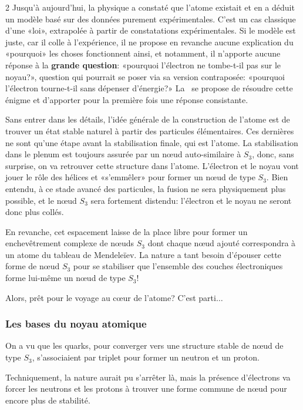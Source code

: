\begin{multicols}{2}
Jusqu'à aujourd'hui, la physique a constaté que l'atome existait et en
a déduit un modèle basé sur des données purement expérimentales. C'est
un cas classique d'une «loi», extrapolée à partir de constatations
expérimentales\cite{poincare:1902:sh}. Si le modèle est juste, car il colle à l'expérience,
il ne propose en revanche aucune explication du «pourquoi» les choses
fonctionnent ainsi, et notamment, il n'apporte aucune réponse à la
\textbf{grande question}: «pourquoi l'électron ne tombe-t-il pas sur le
noyau?», question qui pourrait se poser via sa version contraposée:
«pourquoi l'électron tourne-t-il sans dépenser d'énergie?» La \PQ\
se propose de résoudre cette énigme et d'apporter pour la première
fois une réponse consistante.

Sans entrer dans les détails, l'idée générale de la construction de l'atome est de
trouver un état stable naturel à partir des particules élémentaires.
Ces dernières ne sont qu'une étape avant la stabilisation finale, qui
est l'atome. La stabilisation dans le plenum est toujours assurée par
un nœud auto-similaire à $S_3$, donc, sans surprise, on va retrouver cette
structure dans l'atome. L'électron et le noyau vont jouer le rôle des
hélices et «s'emmêler» pour former un nœud de type $S_3$. Bien
entendu, à ce stade avancé des particules, la fusion ne sera physiquement 
plus possible, et le nœud $S_3$ sera fortement distendu:
l'électron et le noyau ne seront donc plus collés.

En revanche, cet espacement laisse de la place libre pour former un
enchevêtrement complexe de nœuds $S_3$ dont chaque nœud ajouté
correspondra à un atome du tableau de Mendeleïev. La nature a tant
besoin d'épouser cette forme de nœud $S_3$ pour se stabiliser que
l'ensemble des couches électroniques forme lui-même un nœud de type
$S_3$!

Alors, prêt pour le voyage au cœur de l'atome? C'est parti$\ldots$

\subsubsection{Les bases du noyau atomique}

On a vu que les quarks, pour converger vers une structure stable de
nœud de type $S_3$, s'associaient par triplet pour former un neutron et un
proton.

Techniquement, la nature aurait pu s'arrêter là, mais la présence
d'électrons va forcer les neutrons et les protons à trouver une forme
commune de nœud pour encore plus de stabilité.


\end{multicols}
